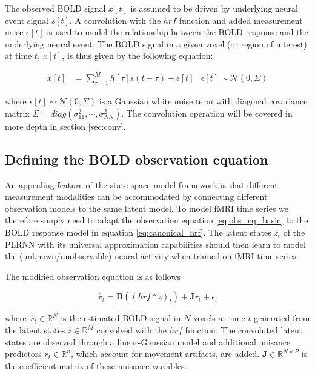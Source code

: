 The observed BOLD signal $x[t]$ is assumed to be driven by underlying neural event signal $s[t]$. 
A convolution with the $hrf$ function and added measurement noise $\epsilon[t]$ is used to model the relationship between the BOLD response and the 
underlying neural event. The BOLD signal in a given voxel (or region of interest) at time $t$, $x[t]$, is thus given by the following equation:

\begin{align}
    x[t] &= \sum_{\tau=1}^{M} h[\tau] s(t-\tau) + \epsilon[t] & \epsilon[t] \sim \mathcal{N}(0, \Sigma)
\end{align}

where $\epsilon[t] \sim \mathcal{N}(0, \Sigma)$ is a Gaussian white noise term with diagonal covariance matrix $\Sigma = diag(\sigma_{11}^2, \cdots, \sigma_{NN}^2)$.
The convolution operation will be covered in more depth in section \ref{sec:conv}.

\subsection{Defining the BOLD observation equation} \label{sec:bold_obs_eq}

An appealing feature of the state space model framework is that different measurement modalities can be accommodated by connecting different observation
models to the same latent model. To model fMRI time series we therefore simply need to adapt the observation equation \ref{eq:obs_eq_basic} to the BOLD response 
model in equation \ref{eq:canonical_hrf}. The latent states $z_t$ of the PLRNN with its universal approximation capabilities should then learn to model the
(unknown/unobservable) neural activity when trained on fMRI time series. 

The modified observation equation is as follows

\begin{equation}
    \hat{x}_t = \boldsymbol{B} \left( (hrf \ast z)_t\right) + \boldsymbol{J}r_t + \epsilon_t
    \label{eq:bold_obs_eq}
\end{equation}

where $\hat{x}_t \in \mathbb{R}^N$ is the estimated BOLD signal in $N$ voxels at time $t$ generated from the latent states $z \in \mathbb{R}^M$ convolved with the $hrf$ function.
The convoluted latent states are observed through a linear-Gaussian model and additional nuisance predictors $r_t \in \mathbb{R}^n$, which account for movement artifacts, 
are added. $\boldsymbol{J} \in \mathbb{R}^{N \times P}$ is the coefficient matrix of these nuisance variables.

